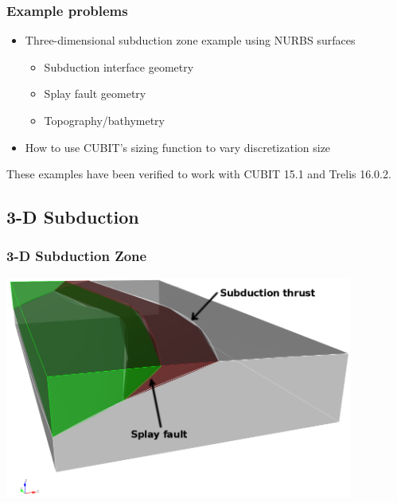 \documentclass{beamer}
\newcommand{\important}[1]{{\color{red}#1}}
\begin{document}
\begin{frame}
  \frametitle{Example problems}
  
  \begin{itemize}
  \item Three-dimensional subduction zone example using NURBS surfaces\\
    \important{{\tt examples/meshing/surface\_nurbs/subduction}}
    \begin{itemize}
    \item Subduction interface geometry
    \item Splay fault geometry
    \item Topography/bathymetry
    \end{itemize}
  \item How to use CUBIT's sizing function to vary discretization size\\
    \important{{\tt examples/meshing/cubit\_cellsize}}
  \end{itemize}
  \vfill
  \important{These examples have been verified to work with CUBIT 15.1
    and Trelis 16.0.2.}


\end{frame}


\subsection{3-D Subduction}

\begin{frame}
  \frametitle{3-D Subduction Zone}
 
  \vfill
  \begin{center}
    \includegraphics[width=4.5in]{figs/subduction3d_geometry}
  \end{center}
  \vfill

\end{frame}
\end{document}
